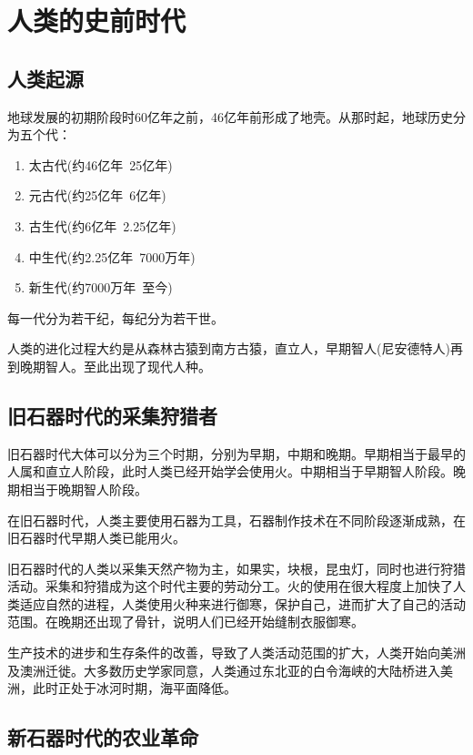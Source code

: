 \section{人类的史前时代}
\subsection{人类起源}
地球发展的初期阶段时60亿年之前，46亿年前形成了地壳。从那时起，地球历史分为五个代：
\begin{enumerate}
    \item 太古代(约46亿年~25亿年)
    \item 元古代(约25亿年~6亿年)
    \item 古生代(约6亿年~2.25亿年)
    \item 中生代(约2.25亿年~7000万年)
    \item 新生代(约7000万年~至今)
\end{enumerate}

每一代分为若干纪，每纪分为若干世。

人类的进化过程大约是从森林古猿到南方古猿，直立人，早期智人(尼安德特人)再到晚期智人。至此出现了现代人种。

\subsection{旧石器时代的采集狩猎者}

旧石器时代大体可以分为三个时期，分别为早期，中期和晚期。早期相当于最早的人属和直立人阶段，此时人类已经开始学会使用火。中期相当于早期智人阶段。晚期相当于晚期智人阶段。

在旧石器时代，人类主要使用石器为工具，石器制作技术在不同阶段逐渐成熟，在旧石器时代早期人类已能用火。

旧石器时代的人类以采集天然产物为主，如果实，块根，昆虫灯，同时也进行狩猎活动。采集和狩猎成为这个时代主要的劳动分工。火的使用在很大程度上加快了人类适应自然的进程，人类使用火种来进行御寒，保护自己，进而扩大了自己的活动范围。在晚期还出现了骨针，说明人们已经开始缝制衣服御寒。

生产技术的进步和生存条件的改善，导致了人类活动范围的扩大，人类开始向美洲及澳洲迁徙。大多数历史学家同意，人类通过东北亚的白令海峡的大陆桥进入美洲，此时正处于冰河时期，海平面降低。

\subsection{新石器时代的农业革命}


